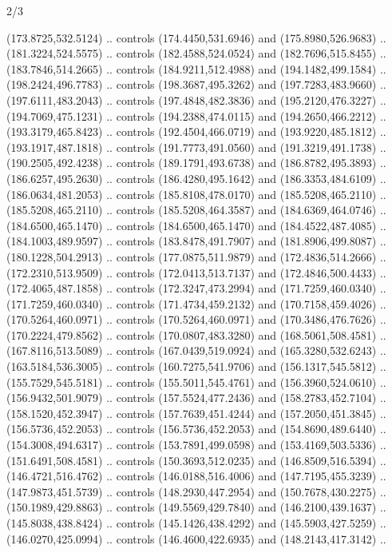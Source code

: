 \begin{flagdescription}{2/3}
\begin{scope}[shift={(0.5\flaglength,0.5)},scale=\flagwidth/545]
\begin{scope}[y=0.80pt, x=0.80pt, yscale=-1,shift={(-297,-430)}]
\begin{scope}[shift={(28.51887,-25.61095)}]
  (173.8725,532.5124) .. controls (174.4450,531.6946) and (175.8980,526.9683) ..
  (181.3224,524.5575) .. controls (182.4588,524.0524) and (182.7696,515.8455) ..
  (183.7846,514.2665) .. controls (184.9211,512.4988) and (194.1482,499.1584) ..
  (198.2424,496.7783) .. controls (198.3687,495.3262) and (197.7283,483.9660) ..
  (197.6111,483.2043) .. controls (197.4848,482.3836) and (195.2120,476.3227) ..
  (194.7069,475.1231) .. controls (194.2388,474.0115) and (194.2650,466.2212) ..
  (193.3179,465.8423) .. controls (192.4504,466.0719) and (193.9220,485.1812) ..
  (193.1917,487.1818) .. controls (191.7773,491.0560) and (191.3219,491.1738) ..
  (190.2505,492.4238) .. controls (189.1791,493.6738) and (186.8782,495.3893) ..
  (186.6257,495.2630) .. controls (186.4280,495.1642) and (186.3353,484.6109) ..
  (186.0634,481.2053) .. controls (185.8108,478.0170) and (185.5208,465.2110) ..
  (185.5208,465.2110) .. controls (185.5208,464.3587) and (184.6369,464.0746) ..
  (184.6500,465.1470) .. controls (184.6500,465.1470) and (184.4522,487.4085) ..
  (184.1003,489.9597) .. controls (183.8478,491.7907) and (181.8906,499.8087) ..
  (180.1228,504.2913) .. controls (177.0875,511.9879) and (172.4836,514.2666) ..
  (172.2310,513.9509) .. controls (172.0413,513.7137) and (172.4846,500.4433) ..
  (172.4065,487.1858) .. controls (172.3247,473.2994) and (171.7259,460.0340) ..
  (171.7259,460.0340) .. controls (171.4734,459.2132) and (170.7158,459.4026) ..
  (170.5264,460.0971) .. controls (170.5264,460.0971) and (170.3486,476.7626) ..
  (170.2224,479.8562) .. controls (170.0807,483.3280) and (168.5061,508.4581) ..
  (167.8116,513.5089) .. controls (167.0439,519.0924) and (165.3280,532.6243) ..
  (163.5184,536.3005) .. controls (160.7275,541.9706) and (156.1317,545.5812) ..
  (155.7529,545.5181) .. controls (155.5011,545.4761) and (156.3960,524.0610) ..
  (156.9432,501.9079) .. controls (157.5524,477.2436) and (158.2783,452.7104) ..
  (158.1520,452.3947) .. controls (157.7639,451.4244) and (157.2050,451.3845) ..
  (156.5736,452.2053) .. controls (156.5736,452.2053) and (154.8690,489.6440) ..
  (154.3008,494.6317) .. controls (153.7891,499.0598) and (153.4169,503.5336) ..
  (151.6491,508.4581) .. controls (150.3693,512.0235) and (146.8509,516.5394) ..
  (146.4721,516.4762) .. controls (146.0188,516.4006) and (147.7195,455.3239) ..
  (147.9873,451.5739) .. controls (148.2930,447.2954) and (150.7678,430.2275) ..
  (150.1989,429.8863) .. controls (149.5569,429.7840) and (146.2100,439.1637) ..
  (145.8038,438.8424) .. controls (145.1426,438.4292) and (145.5903,427.5259) ..
  (146.0270,425.0994) .. controls (146.4600,422.6935) and (148.2143,417.3142) ..

\end{scope}
\end{scope}
\end{scope}
\end{flagdescription}
